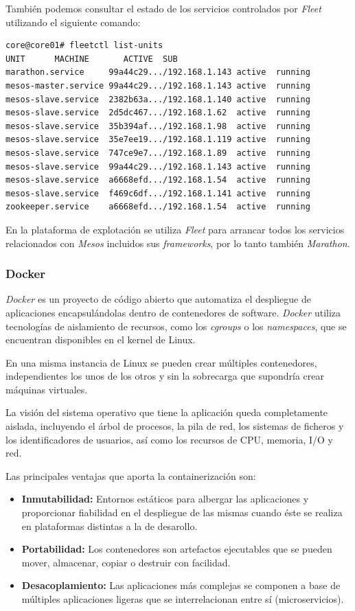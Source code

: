 \documentclass[a4paper,12pt,spanish,final]{epsc_tfc_pfc}
\begin{document}
También podemos consultar el estado de los servicios controlados por \emph{Fleet} utilizando el siguiente comando:\\

\begin{lstlisting}[style=dnsmasq]
core@core01# fleetctl list-units
UNIT      MACHINE       ACTIVE  SUB
marathon.service     99a44c29.../192.168.1.143 active  running
mesos-master.service 99a44c29.../192.168.1.143 active  running
mesos-slave.service  2382b63a.../192.168.1.140 active  running
mesos-slave.service  2d5dc467.../192.168.1.62  active  running
mesos-slave.service  35b394af.../192.168.1.98  active  running
mesos-slave.service  35e7ee19.../192.168.1.119 active  running
mesos-slave.service  747ce9e7.../192.168.1.89  active  running
mesos-slave.service  99a44c29.../192.168.1.143 active  running
mesos-slave.service  a6668efd.../192.168.1.54  active  running
mesos-slave.service  f469c6df.../192.168.1.141 active  running
zookeeper.service    a6668efd.../192.168.1.54  active  running
\end{lstlisting}

En la plataforma de explotación se utiliza \emph{Fleet} para arrancar todos los servicios relacionados con \emph{Mesos} incluidos sus \emph{frameworks}, por lo tanto también \emph{Marathon}.

\subsubsection{Docker}

\emph{Docker} es un proyecto de código abierto que automatiza el despliegue de aplicaciones encapsulándolas dentro de contenedores de software. \emph{Docker} utiliza tecnologías de aislamiento de recursos, como los \emph{cgroups} o los \emph{namespaces}, que se encuentran disponibles en el kernel de Linux.

En una misma instancia de Linux se pueden crear múltiples contenedores, independientes los unos de los otros y sin la sobrecarga que supondría crear máquinas virtuales.

La visión del sistema operativo que tiene la aplicación queda completamente aislada, incluyendo el árbol de procesos, la pila de red, los sistemas de ficheros y los identificadores de usuarios, así como los recursos de CPU, memoria, I/O y red.

Las principales ventajas que aporta la containerización son:
\begin{itemize}
  \item \textbf{Inmutabilidad:} Entornos estáticos para albergar las aplicaciones y proporcionar fiabilidad en el despliegue de las mismas cuando éste se realiza en plataformas distintas a la de desarollo.
  \item \textbf{Portabilidad:} Los contenedores son artefactos ejecutables que se pueden mover, almacenar, copiar o destruir con facilidad.
  \item \textbf{Desacoplamiento:} Las aplicaciones más complejas se componen a base de múltiples aplicaciones ligeras que se interrelacionan entre sí (microservicios).
\end{itemize}
\end{document}
